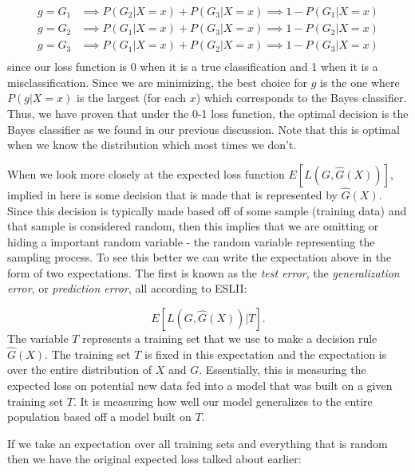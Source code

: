 \documentclass[paper=a4, fontsize=11pt]{scrartcl} %
\numberwithin{equation}{section} %
\numberwithin{figure}{section} %
\numberwithin{table}{section} %
\begin{document}
\begin{equation}
\begin{split}
g=G_1 & \implies P(G_2|X=x) + P(G_3|X=x) \implies 1-P(G_1|X=x)\\
g=G_2 & \implies P(G_1|X=x) + P(G_3|X=x) \implies 1-P(G_2|X=x)\\
g=G_3 & \implies P(G_1|X=x) + P(G_2|X=x) \implies 1-P(G_3|X=x)\\
\end{split}
\end{equation}
since our loss function is 0 when it is a true classification and 1 when it is a misclassification. Since we are minimizing, the best choice for $g$ is the one where $P(g|X=x)$ is the largest (for each $x$) which corresponds to the Bayes classifier. Thus, we have proven that under the 0-1 loss function, the optimal decision is the Bayes classifier as we found in our previous discussion. Note that this is optimal when we know the distribution which most times we don't.

When we look more closely at the expected loss function $E[L(G, \hat{G}(X))]$, implied in here is some decision that is made that is represented by $\hat{G}(X)$. Since this decision is typically made based off of some sample (training data) and that sample is considered random, then this implies that we are omitting or hiding a important random variable - the random variable representing the sampling process. To see this better we can write the expectation above in the form of two expectations. The first is known as the \emph{test error}, the \emph{generalization error}, or \emph{prediction error}, all according to ESLII:

\begin{equation}
E[L(G, \hat{G}(X))|T].
\end{equation}
The variable $T$ represents a training set that we use to make a decision rule $\hat{G}(X)$. The training set $T$ is fixed in this expectation and the expectation is over the entire distribution of $X$ and $G$. Essentially, this is measuring the expected loss on potential new data fed into a model that was built on a given training set $T$. It is measuring how well our model generalizes to the entire population based off a model built on $T$.

If we take an expectation over all training sets and everything that is random then we have the original expected loss talked about earlier:
\end{document}
